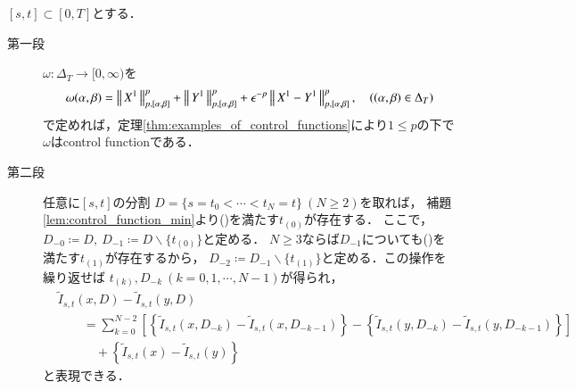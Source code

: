 	\begin{prf}
		$[s,t] \subset [0,T]$とする．
		\begin{description}
			\item[第一段]
				$\omega:\Delta_T \longrightarrow [0,\infty)$を
				\begin{align}
					\omega(\alpha,\beta) = \left\|\, X^1\, \right\|_{p,[\alpha,\beta]}^p + \left\|\, Y^1\, \right\|_{p,[\alpha,\beta]}^p + \epsilon^{-p} \left\|\, X^1 - Y^1\, \right\|_{p,[\alpha,\beta]}^p,
					\quad ((\alpha,\beta) \in \Delta_T)
				\end{align}
				で定めれば，定理\ref{thm:examples_of_control_functions}により$1 \leq p$の下で$\omega$はcontrol functionである．
				
			\item[第二段]
				任意に$[s,t]$の分割
				$D = \{s=t_0 < \cdots < t_N=t\}\ (N \geq 2)$を取れば，
				補題\ref{lem:control_function_min}より()を満たす$t_{(0)}$が存在する．
				ここで，$D_{-0} \coloneqq D,\ D_{-1} \coloneqq D \backslash \{t_{(0)}\}$と定める．
				$N \geq 3$ならば$D_{-1}$についても()を満たす$t_{(1)}$が存在するから，
				$D_{-2} \coloneqq D_{-1} \backslash \{t_{(1)}\}$と定める．この操作を繰り返せば
				$t_{(k)},D_{-k}\ (k=0,1,\cdots,N-1)$が得られ，
				\begin{align}
					&\tilde{I}_{s,t}(x,D) - \tilde{I}_{s,t}(y,D) \\
					&\qquad = \sum_{k=0}^{N-2} \left[ \left\{ \tilde{I}_{s,t}(x,D_{-k}) - \tilde{I}_{s,t}(x,D_{-k-1}) \right\} - 
						\left\{ \tilde{I}_{s,t}(y,D_{-k}) - \tilde{I}_{s,t}(y,D_{-k-1}) \right\} \right] \label{eq:continuity_theorem_1_1}\\
					&\quad \qquad + \left\{ \tilde{I}_{s,t}(x) - \tilde{I}_{s,t}(y) \right\}	\label{eq:continuity_theorem_1_2}
				\end{align}
				と表現できる．
			

\end{description}
\end{prf}
